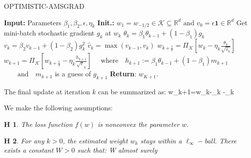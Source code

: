 \documentclass[11pt]{article}
\newtheorem{assumption}{H\!\!}
\theoremstyle{k}
\begin{document}
\begin{algorithm}[H]
\caption{OPTIMISTIC-AMSGRAD}\label{alg:optamsgrad}
  \begin{algorithmic}[1]
  \STATE \textbf{Input:} Parameters $\beta_{1}, \beta_{2}, \epsilon, \eta_{k}$
  \STATE \textbf{Init.:} $w_{1}=w_{-1 / 2} \in \mathcal{K} \subseteq \mathbb{R}^{d} \text { and } v_{0}=\epsilon \mathbf{1} \in \mathbb{R}^{d}$
  \STATE Get mini-batch stochastic gradient $g_{k}$ at $w_{k}$
   \STATE $\theta_{k}=\beta_{1} \theta_{k-1}+\left(1-\beta_{1}\right) g_{k}$
   \STATE $v_{k}=\beta_{2} v_{k-1}+\left(1-\beta_{2}\right) g_{k}^{2}$
   \STATE $ \hat{v}_{k}=\max \left(\hat{v}_{k-1}, v_{k}\right)$
   \STATE $ w_{k+\frac{1}{2}}=\Pi_{\mathcal{K}}\left[w_k-\eta_{k} \frac{\theta_{k}}{\sqrt{\hat{v}_{k}}}\right]$
   \STATE $ w_{k+1}=\Pi_{\mathcal{K}}\left[w_{k+\frac{1}{2}}-\eta_{k} \frac{h_{k+1}}{\sqrt{v}_{k}}\right]$
   \STATE $ \quad \text{where} \quad h_{k+1}:=\beta_{1} \theta_{k-1} + (1-\beta_{1}) m_{k+1}$
      \STATE $ \quad\quad \text{and} \quad m_{k+1}$ is a guess of $g_{k+1}$
\ENDFOR
\STATE \textbf{Return}: $w_{K+1}$.
  \end{algorithmic}
\end{algorithm}\vspace{.1cm}
The final update at iteration $k$ can be summarized as:
\beq\label{eq:finalupdate}
w_{k+1}=w_{k}-\eta_{k} -\eta_{k} 
\eeq



We make the following assumptions:
\begin{assumption}\label{ass:nonconv}
The loss function $f(w)$ is nonconvex \wrt the parameter $w$.
\end{assumption}

\begin{assumption}\label{ass:boundedparam}
For any $k >0$, the estimated weight $w_k$ stays within a $\ell_{\infty}-$ball. There exists a constant $W >0$ such that:
\beq
{} \leq W \quad \textrm{almost surely}
\eeq
\end{assumption}
\end{document}
